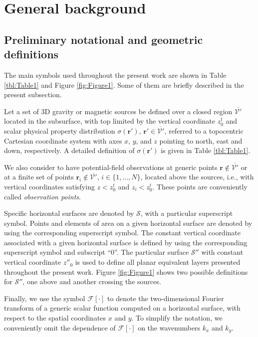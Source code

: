 \section{General background}
\label{sec:background}

\subsection{Preliminary notational and geometric definitions}
\label{sec:preliminaries}

The main symbols used throughout the present work are shown in Table \ref{tbl:Table1} and Figure \ref{fig:Figure1}.
Some of them are briefly described in the present subsection.

Let a set of 3D gravity or magnetic sources be defined over a closed region 
$\overline{\mathcal{V}'}$ located in the subsurface, with top limited by the vertical coordinate $z^{t}_{0}$ 
and scalar physical property distribution $\sigma(\mathbf{r}')$, $\mathbf{r}' \in \overline{\mathcal{V}'}$, 
referred to a topocentric Cartesian coordinate system with axes 
$x$, $y$, and $z$ pointing to north, east and down, respectively.
A detailed definition of $\sigma(\mathbf{r}')$ is given in Table \ref{tbl:Table1}.

We also consider to have potential-field observations at generic points 
$\mathbf{r} \notin \overline{\mathcal{V}'}$ or at a finite set of points 
$\mathbf{r}_{i} \notin \overline{\mathcal{V}'}$, $i \in \{ 1, \dots, N \}$, 
located above the sources, i.e., with vertical coordinates satisfying $z < z^{t}_{0}$ and 
$z_{i} < z^{t}_{0}$. These points are conveniently called \textit{observation points}.

Specific horizontal surfaces are denoted by $\mathcal{S}$, with a particular superscript symbol. 
Points and elements of area on a given horizontal surface are denoted by using the corresponding superscript symbol. 
The constant vertical coordinate associated with a given horizontal surface is defined by using the 
corresponding superscript symbol and subscript ``$0$''. 
The particular surface $\mathcal{S}''$ with constant vertical coordinate $z''_{0}$ is used to define all
planar equivalent layers presented throughout the present work. Figure \ref{fig:Figure1} shows two possible 
definitions for $\mathcal{S}''$, one above and another crossing the sources.

Finally, we use the symbol $\mathcal{F} [ \cdot ]$ to denote the two-dimensional Fourier transform of a generic scalar 
function computed on a horizontal surface, with respect to the spatial coordinates $x$ and $y$. 
To simplify the notation, we conveniently omit the dependence of $\mathcal{F} [ \cdot ]$ on the 
wavenumbers $k_{x}$ and $k_{y}$.


